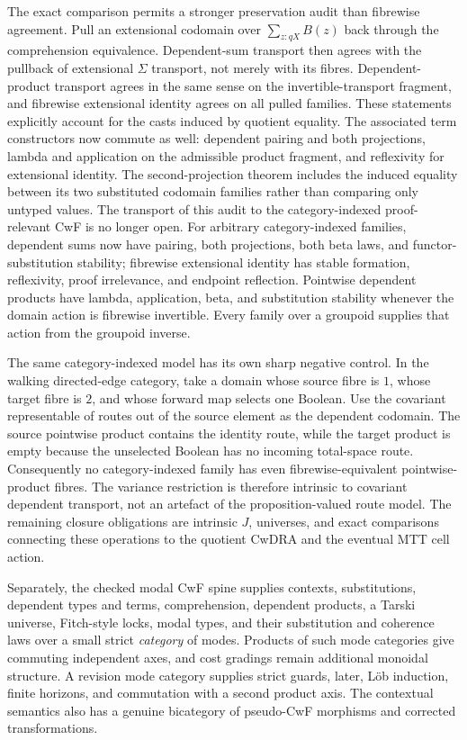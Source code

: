 \documentclass[11pt]{article}
\theoremstyle{definition}
\theoremstyle{remark}
\begin{document}
The exact comparison permits a stronger preservation audit than fibrewise
agreement.  Pull an extensional codomain over $\sum_{z:qX}B(z)$ back through
the comprehension equivalence.  Dependent-sum transport then agrees with the
pullback of extensional $\Sigma$ transport, not merely with its fibres.
Dependent-product transport agrees in the same sense on the
invertible-transport fragment, and fibrewise extensional identity agrees on
all pulled families.  These statements explicitly account for the casts
induced by quotient equality.  The associated term constructors now commute
as well: dependent pairing and both projections, lambda and application on the
admissible product fragment, and reflexivity for extensional identity.  The
second-projection theorem includes the induced equality between its two
substituted codomain families rather than comparing only untyped values.  The
transport of this audit to the category-indexed proof-relevant CwF is no longer
open.  For arbitrary category-indexed families, dependent sums now have
pairing, both projections, both beta laws, and functor-substitution stability;
fibrewise extensional identity has stable formation, reflexivity, proof
irrelevance, and endpoint reflection.  Pointwise dependent products have
lambda, application, beta, and substitution stability whenever the domain
action is fibrewise invertible.  Every family over a groupoid supplies that
action from the groupoid inverse.

The same category-indexed model has its own sharp negative control.  In the
walking directed-edge category, take a domain whose source fibre is $1$, whose
target fibre is $2$, and whose forward map selects one Boolean.  Use the
covariant representable of routes out of the source element as the dependent
codomain.  The source pointwise product contains the identity route, while the
target product is empty because the unselected Boolean has no incoming
total-space route.  Consequently no category-indexed family has even
fibrewise-equivalent pointwise-product fibres.  The variance restriction is
therefore intrinsic to covariant dependent transport, not an artefact of the
proposition-valued route model.  The remaining closure obligations are
intrinsic $J$, universes, and exact comparisons connecting these operations to
the quotient CwDRA and the eventual MTT cell action.

Separately, the checked modal CwF spine supplies contexts, substitutions,
dependent types and terms, comprehension, dependent products, a Tarski
universe, Fitch-style locks, modal types, and their substitution and coherence
laws over a small strict \emph{category} of modes.  Products of such mode
categories give commuting independent axes, and cost gradings remain additional
monoidal structure.  A revision mode category supplies strict guards, later,
L\"ob induction, finite horizons, and commutation with a second product axis.
The contextual semantics also has a genuine bicategory of pseudo-CwF morphisms
and corrected transformations.
\end{document}
